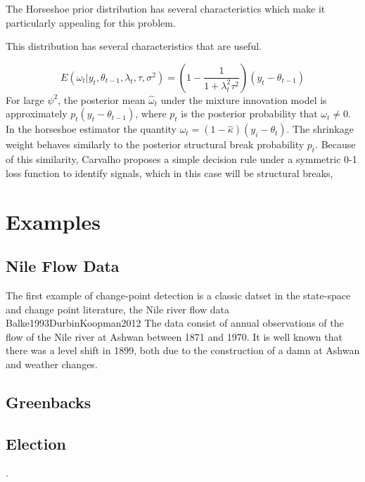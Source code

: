 \documentclass{article}
\begin{document}
The Horseshoe prior distribution has several characteristics which make it particularly appealing for this problem.

This distribution has several characteristics that are useful.

\begin{equation}
  \label{eq:10}
  E(\omega_{t} | y_{t}, \theta_{t-1}, \lambda_{t}, \tau, \sigma^{2}) =
  \left(
    1 - \frac{1}{1 + \lambda_{t}^{2} \tau^{2}}
  \right) (y_{t} - \theta_{t - 1})
\end{equation}
For large $\psi^{2}$, the posterior mean $\hat\omega_{t}$ under the mixture innovation model is 
approximately $p_{t} (y_{t} - \theta_{t-1})$, where $p_{t}$ is the posterior probability that $\omega_{t} \neq 0$.
In the horseshoe estimator the quantity $\hat \omega_{t} = (1 - \hat \kappa) (y_{i} - \theta_{t})$.
The shrinkage weight behaves similarly to the posterior structural break probability $p_{t}$.
Because of this similarity, Carvalho proposes a simple decision rule under a symmetric 0-1 loss function
to identify signals, which in this case will be structural breaks,

\section{Examples}
\label{sec:examples}

\subsection{Nile Flow Data}
\label{sec:nile}

The first example of change-point detection is a classic datset in the state-space and change point literature, the Nile river flow data \textcite{Cobb1978}{Balke1993}{DurbinKoopman2012}
The data consist of annual observations of the flow of the Nile river at Ashwan between 1871 and 1970. 
It is well known that there was a level shift in 1899, both due to the construction of a damn at Ashwan and weather changes.

\subsection{Greenbacks}
\label{sec:greenbacks-graybacks}

\subsection{Election}
\label{sec:election}

\textcite{RatkovicEng2010}.

\printbibliography{}
\end{document}
